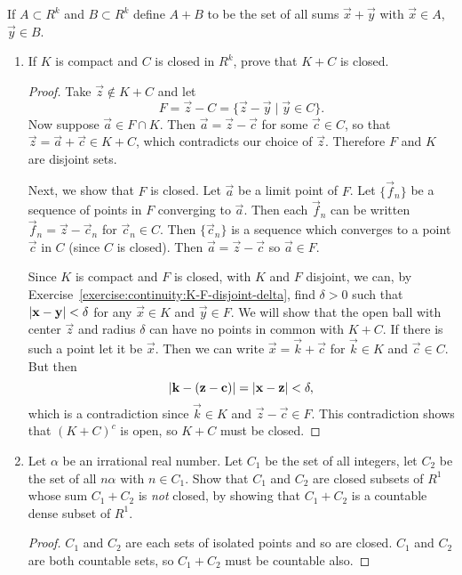  If $A\subset R^k$ and $B\subset R^k$ define $A + B$ to
be the set of all sums $\vec{x} + \vec{y}$ with $\vec{x}\in A$,
$\vec{y}\in B$.
\begin{enumerate}
\item If $K$ is compact and $C$ is closed in $R^k$, prove that $K + C$
  is closed.
  \begin{proof}
    Take $\vec{z}\not\in K + C$ and let
    \begin{equation*}
      F = \vec{z} - C = \{\vec{z} - \vec{y} \mid \vec{y}\in C\}.
    \end{equation*}
    Now suppose $\vec{a}\in F\cap K$. Then
    $\vec{a} = \vec{z} - \vec{c}$ for some $\vec{c}\in C$, so that
    $\vec{z} = \vec{a} + \vec{c} \in K + C$, which contradicts our
    choice of $\vec{z}$. Therefore $F$ and $K$ are disjoint sets.

    Next, we show that $F$ is closed. Let $\vec{a}$ be a limit point
    of $F$. Let $\{\vec{f}_n\}$ be a sequence of points in $F$
    converging to $\vec{a}$. Then each $\vec{f}_n$ can be written
    $\vec{f}_n = \vec{z} - \vec{c}_n$ for $\vec{c}_n\in C$. Then
    $\{\vec{c}_n\}$ is a sequence which converges to a point $\vec{c}$
    in $C$ (since $C$ is closed). Then $\vec{a} = \vec{z} - \vec{c}$
    so $\vec{a}\in F$.

    Since $K$ is compact and $F$ is closed, with $K$ and $F$ disjoint,
    we can, by Exercise~\ref{exercise:continuity:K-F-disjoint-delta},
    find $\delta > 0$ such that $\lvert{\mathbf{x} - \mathbf{y}}\rvert < \delta$ for
    any $\vec{x}\in K$ and $\vec{y}\in F$. We will show that the open
    ball with center $\vec{z}$ and radius $\delta$ can have no points
    in common with $K + C$. If there is such a point let it be
    $\vec{x}$. Then we can write $\vec{x} = \vec{k} + \vec{c}$ for
    $\vec{k}\in K$ and $\vec{c}\in C$. But then
    \begin{equation*}
      \lvert{\mathbf{k} - (\mathbf{z} - \mathbf{c})}\rvert
      = \lvert{\mathbf{x} - \mathbf{z}}\rvert < \delta,
    \end{equation*}
    which is a contradiction since $\vec{k}\in K$ and
    $\vec{z} - \vec{c}\in F$. This contradiction shows that
    $(K + C)^c$ is open, so $K + C$ must be closed.
  \end{proof}
\item Let $\alpha$ be an irrational real number. Let $C_1$ be the set
  of all integers, let $C_2$ be the set of all $n\alpha$ with
  $n\in C_1$. Show that $C_1$ and $C_2$ are closed subsets of $R^1$
  whose sum $C_1 + C_2$ is {\em not} closed, by showing that
  $C_1 + C_2$ is a countable dense subset of $R^1$.
  \begin{proof}
    $C_1$ and $C_2$ are each sets of isolated points and so are
    closed. $C_1$ and $C_2$ are both countable sets, so $C_1 + C_2$
    must be countable also.


\end{proof}
\end{enumerate}
